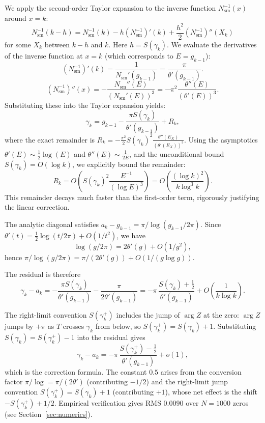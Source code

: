 \documentclass{pre-aomart}
\def\zeta{Z}%
\def\xi{X}%
\theoremstyle{plain}
\theoremstyle{definition}
\theoremstyle{remark}
\begin{document}
We apply the second-order Taylor expansion to the inverse function $N_{\text{sm}}^{-1}(x)$ around $x=k$:
\[
N_{\text{sm}}^{-1}(k - h) = N_{\text{sm}}^{-1}(k) - h (N_{\text{sm}}^{-1})'(k) + \frac{h^2}{2} (N_{\text{sm}}^{-1})''(\xi_k)
\]
for some $\xi_k$ between $k-h$ and $k$.
Here $h = S(\gamma_k)$. We evaluate the derivatives of the inverse function at $x=k$ (which corresponds to $E = g_{k-1}$):
\[
(N_{\text{sm}}^{-1})'(k) = \frac{1}{N_{\text{sm}}'(g_{k-1})} = \frac{\pi}{\theta'(g_{k-1})}.
\]
\[
(N_{\text{sm}}^{-1})''(x) = -\frac{N_{\text{sm}}''(E)}{(N_{\text{sm}}'(E))^3} = -\pi^2 \frac{\theta''(E)}{(\theta'(E))^3}.
\]
Substituting these into the Taylor expansion yields:
\[
\gamma_k = g_{k-1} - \frac{\pi S(\gamma_k)}{\theta'(g_{k-1})} + R_k,
\]
where the exact remainder is $R_k = -\frac{\pi^2}{2} S(\gamma_k)^2 \frac{\theta''(E_{\xi})}{(\theta'(E_{\xi}))^3}$.
Using the asymptotics $\theta'(E) \sim \frac{1}{2}\log(E)$ and $\theta''(E) \sim \frac{1}{2E}$, and the unconditional bound $S(\gamma_k) = O(\log k)$, we explicitly bound the remainder:
\[
R_k = O\left( S(\gamma_k)^2 \frac{E^{-1}}{(\log E)^3} \right) = O\left( \frac{(\log k)^2}{k \log^3 k} \right).
\]
This remainder decays much faster than the first-order term, rigorously justifying the linear correction.

The analytic diagonal satisfies $a_k - g_{k-1} = \pi/\log(g_{k-1}/2\pi)$.
Since $\theta'(t) = \frac12\log(t/2\pi) + O(1/t^2)$, we have
\[
\log(g/2\pi) = 2\theta'(g) + O(1/g^2),
\]
hence $\pi/\log(g/2\pi) = \pi/(2\theta'(g)) + O(1/(g\log g))$.

The residual is therefore
\[
\gamma_k - a_k = -\frac{\pi S(\gamma_k)}{\theta'(g_{k-1})}
                 - \frac{\pi}{2\theta'(g_{k-1})}
               = -\pi\,\frac{S(\gamma_k) + \frac12}{\theta'(g_{k-1})}
                 + O\!\left(\frac{1}{k\log k}\right).
\]

The right-limit convention $S(\gamma_k^+)$ includes the jump of $\arg\zeta$
at the zero: $\arg\zeta$ jumps by $+\pi$ as $T$ crosses $\gamma_k$ from
below, so $S(\gamma_k^+) = S(\gamma_k) + 1$.  Substituting
$S(\gamma_k) = S(\gamma_k^+) - 1$ into the residual gives
\[
\gamma_k - a_k = -\pi\,\frac{S(\gamma_k^+) - \frac12}{\theta'(g_{k-1})}
                 + o(1),
\]
which is the correction formula.  The constant $0.5$ arises from the
conversion factor $\pi/\log = \pi/(2\theta')$ (contributing $-1/2$) and
the right-limit jump convention $S(\gamma_k^+)=S(\gamma_k)+1$ (contributing
$+1$), whose net effect is the shift $-S(\gamma_k^+) + 1/2$.  Empirical
verification gives RMS $0.0090$ over $N=1000$ zeros
(see Section~\ref{sec:numerics}).
\end{document}
